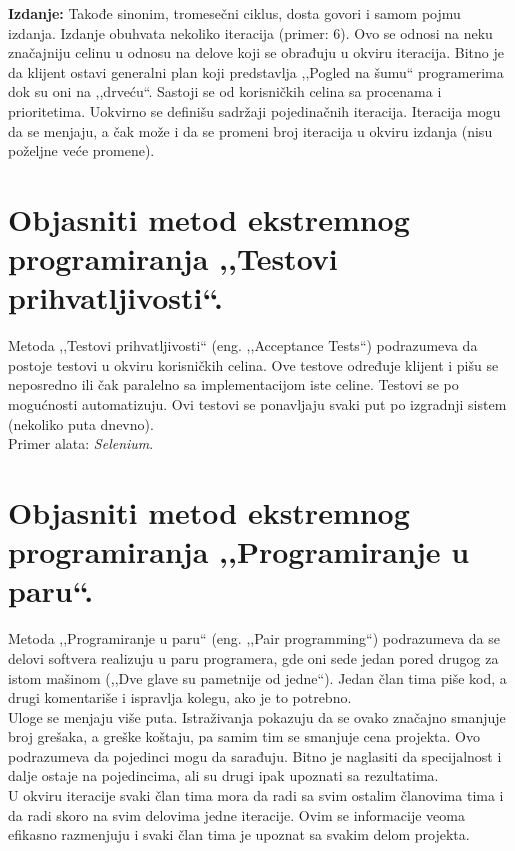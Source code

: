 \documentclass[a4paper]{article}
\begin{document}
  \textbf{Izdanje:} Takođe sinonim, tromesečni ciklus, dosta govori i samom pojmu izdanja.
  Izdanje obuhvata nekoliko iteracija (primer: 6). Ovo se odnosi na neku značajniju celinu
  u odnosu na delove koji se obrađuju u okviru iteracija. Bitno je da klijent ostavi generalni
  plan koji predstavlja ,,Pogled na šumu`` programerima dok su oni na ,,drveću``. Sastoji 
  se od korisničkih celina sa procenama i prioritetima. Uokvirno se definišu sadržaji pojedinačnih 
  iteracija. Iteracija mogu da se menjaju, a čak može i da se promeni broj iteracija u okviru 
  izdanja (nisu poželjne veće promene). 
  
\section{Objasniti metod ekstremnog programiranja ,,Testovi prihvatljivosti``.}
  Metoda ,,Testovi prihvatljivosti`` (eng. ,,Acceptance Tests``) podrazumeva 
  da postoje testovi u okviru korisničkih celina. Ove testove određuje klijent i pišu se 
  neposredno ili čak paralelno sa implementacijom iste celine. Testovi se po mogućnosti automatizuju. 
  Ovi testovi se ponavljaju svaki put po izgradnji sistem (nekoliko puta dnevno).
  \cite{xporg_acceptance_tests}\\
  Primer alata: \textit{Selenium}. 

\section{Objasniti metod ekstremnog programiranja ,,Programiranje u paru``.}
  Metoda ,,Programiranje u paru`` (eng. ,,Pair programming``) podrazumeva da se delovi
  softvera realizuju u paru programera, gde oni sede jedan pored drugog za istom
  mašinom (,,Dve glave su pametnije od jedne``). Jedan član tima piše kod, a drugi komentariše
  i ispravlja kolegu, ako je to potrebno. \\
  \indent Uloge se menjaju više puta. Istraživanja pokazuju da
  se ovako značajno smanjuje broj grešaka, a greške koštaju, pa samim tim se smanjuje
  cena projekta. Ovo podrazumeva da pojedinci mogu da sarađuju. Bitno je naglasiti
  da specijalnost i dalje ostaje na pojedincima, ali su drugi ipak upoznati sa rezultatima.\\
  \indent U okviru iteracije svaki član tima mora da radi sa svim ostalim članovima tima 
  i da radi skoro na svim delovima jedne iteracije. Ovim se informacije veoma efikasno razmenjuju 
  i svaki član tima je upoznat sa svakim delom projekta.
\end{document}
